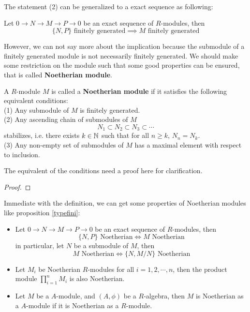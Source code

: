 The statement (2) can be generalized to a exact sequence as following:
\begin{corollary}
Let \(0 \to N \to M \to P \to 0\) be an exact sequence of \(R\)-modules, then
\[\{N,P\} \text{ finitely generated} \implies M \text{ finitely generated}\]
\end{corollary}

However, we can not say more about the implication because the submodule of a finitely generated module is not necessarily finitely generated. We should make some restriction on the module such that some good properties can be ensured, that is called \textbf{Noetherian module}.
\begin{definition}
    A \(R\)-module \(M\) is called a \textbf{Noetherian module} if it satisfies the following equivalent conditions:\\
    (1) Any submodule of \(M\) is finitely generated.\\
    (2) Any ascending chain of submodules of \(M\)
    \[N_1 \subset N_2 \subset N_3 \subset \cdots\]
    stabilizes, i.e. there exists \(k \in \mathbb{N}\) such that for all \(n \geq k\), \(N_n = N_k\).\\
    (3) Any non-empty set of submodules of \(M\) has a maximal element with respect to inclusion.

\end{definition}

The equivalent of the conditions need a proof here for clarification.
\begin{proof}

\end{proof}

Immediate with the definition, we can get some properties of Noetherian modules like proposition \ref{typefini}:
\begin{itemize}
    \item Let \(0 \to N \to M \to P \to 0\) be an exact sequence of \(R\)-modules, then
     \[\{N,P\} \text{ Noetherian} \iff M \text{ Noetherian}\]
    in particular, let \(N\) be a submodule of \(M\), then
    \[M \text{ Noetherian} \iff \{N, M/N\} \text{ Noetherian}\]

    \item Let \(M_i\) be Noetherian \(R\)-modules for all \(i=1,2,\cdots, n\), then the product module \(\prod_{i=1}^n M_i\) is also Noetherian.

    \item Let \(M\) be a \(A\)-module, and \((A,\phi)\) be a \(R\)-algebra, then \(M\) is Noetherian as a \(A\)-module if it is Noetherian as a \(R\)-module.
\end{itemize}


